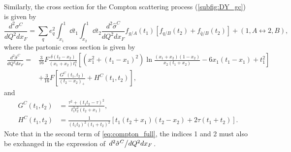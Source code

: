 Similarly, the cross section for the Compton scattering process (\cref{subfig:DY_gc}) is given by 
\begin{equation}
	\frac{d^2\sigma^C}{dQ^2dx_{F}} = \sum_q e^2_q \int^1_{x_1} \dd{t_1} \int^1_{x_2} \dd{t_2}
	\frac{d^2\hat{\sigma}^{C}}{dQ^2dx_F} f_{g/A}\left(t_1\right)
	\left[f_{q/B}\left(t_2\right) +f_{\bar{q}/B}\left(t_2\right) \right] + \left(1,A\leftrightarrow 2,B\right),
	\label{eq:compton_full}
\end{equation}
where the partonic cross section is given by
\begin{equation}
	\begin{split}
		\frac{d^2\hat{\sigma}^{C}}{dQ^2dx_F} =&\frac{3}{16} F \frac{\delta\left(t_2-x_2\right)}{\left(x_1+x_2\right)t_1^3}\left[ \left(x_1^2+\left(t_1-x_1\right)^2\right)\ln\frac{\left(x_1+x_2\right)\left(1-x_2\right)}{x_2\left(t_1+x_2\right)} - 6x_1\left(t_1-x_1\right)+t_1^2\right]\\
		&+\frac{3}{16}F\left[\frac{G^C\left(t_1,t_2\right)}{\left(t_2-x_2\right)_{+}} + H^C \left(t_1,t_2\right) \right],
	\end{split}
\end{equation}
and
\begin{align}
	G^C\left(t_1,t_2\right) &= \frac{\tau^2+\left(t_1t_2-\tau\right)^2}{t_1^3t_2^2\left(t_2+x_1\right)},\\
	H^C\left(t_1,t_2\right) &= \frac{1}{\left(t_1t_2\right)^2\left(t_1+t_2\right)^2}\left[t_1\left(t_2+x_1\right)\left(t_2-x_2\right)+2\tau\left(t_1+t_2\right)\right].
\end{align}
Note that in the second term of \cref{eq:compton_full}, the indices 1 and 2 must also be exchanged in
the expression of $\flatfrac{d^2\hat{\sigma}^{C}}{dQ^2dx_F}$.

